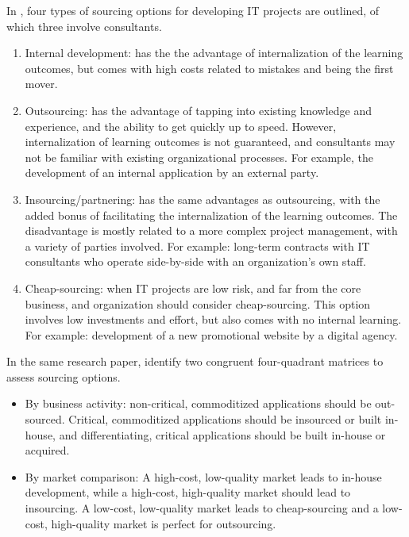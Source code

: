 \documentclass[12pt]{article}
\providecommand{\tightlist}{%
  \setlength{\itemsep}{0pt}\setlength{\parskip}{0pt}}
\begin{document}
In \citet[177-180]{willcocks2003}, four types of sourcing options for
developing IT projects are outlined, of which three involve consultants.

\begin{enumerate}
\def\labelenumi{\arabic{enumi}.}
\tightlist
\item
  Internal development: has the the advantage of internalization of the
  learning outcomes, but comes with high costs related to mistakes and
  being the first mover.
\item
  Outsourcing: has the advantage of tapping into existing knowledge and
  experience, and the ability to get quickly up to speed. However,
  internalization of learning outcomes is not guaranteed, and
  consultants may not be familiar with existing organizational
  processes. For example, the development of an internal application by
  an external party.
\item
  Insourcing/partnering: has the same advantages as outsourcing, with
  the added bonus of facilitating the internalization of the learning
  outcomes. The disadvantage is mostly related to a more complex project
  management, with a variety of parties involved. For example: long-term
  contracts with IT consultants who operate side-by-side with an
  organization's own staff.
\item
  Cheap-sourcing: when IT projects are low risk, and far from the core
  business, and organization should consider cheap-sourcing. This option
  involves low investments and effort, but also comes with no internal
  learning. For example: development of a new promotional website by a
  digital agency.
\end{enumerate}

In the same research paper, \citet[188-189]{willcocks2003} identify two
congruent four-quadrant matrices to assess sourcing options.

\begin{itemize}
\tightlist
\item
  By business activity: non-critical, commoditized applications should
  be out-sourced. Critical, commoditized applications should be
  insourced or built in-house, and differentiating, critical
  applications should be built in-house or acquired.
\item
  By market comparison: A high-cost, low-quality market leads to
  in-house development, while a high-cost, high-quality market should
  lead to insourcing. A low-cost, low-quality market leads to
  cheap-sourcing and a low-cost, high-quality market is perfect for
  outsourcing.
\end{itemize}
\end{document}
